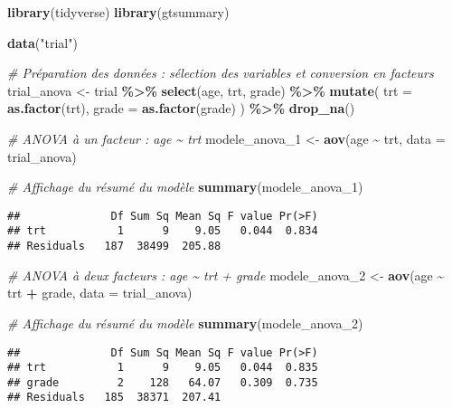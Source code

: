 \documentclass[
]{article}
\newenvironment{Shaded}{\begin{snugshade}}{\end{snugshade}}
\newcommand{\AttributeTok}[1]{\textcolor[rgb]{0.13,0.29,0.53}{#1}}
\newcommand{\CommentTok}[1]{\textcolor[rgb]{0.56,0.35,0.01}{\textit{#1}}}
\newcommand{\FunctionTok}[1]{\textcolor[rgb]{0.13,0.29,0.53}{\textbf{#1}}}
\newcommand{\NormalTok}[1]{#1}
\newcommand{\OtherTok}[1]{\textcolor[rgb]{0.56,0.35,0.01}{#1}}
\newcommand{\SpecialCharTok}[1]{\textcolor[rgb]{0.81,0.36,0.00}{\textbf{#1}}}
\newcommand{\StringTok}[1]{\textcolor[rgb]{0.31,0.60,0.02}{#1}}
\begin{document}
\begin{Shaded}
\begin{Highlighting}[]
\FunctionTok{library}\NormalTok{(tidyverse)}
\FunctionTok{library}\NormalTok{(gtsummary)}

\FunctionTok{data}\NormalTok{(}\StringTok{"trial"}\NormalTok{)}

\CommentTok{\# Préparation des données : sélection des variables et conversion en facteurs}
\NormalTok{trial\_anova }\OtherTok{\textless{}{-}}\NormalTok{ trial }\SpecialCharTok{\%\textgreater{}\%}
  \FunctionTok{select}\NormalTok{(age, trt, grade) }\SpecialCharTok{\%\textgreater{}\%}
  \FunctionTok{mutate}\NormalTok{(}
    \AttributeTok{trt =} \FunctionTok{as.factor}\NormalTok{(trt),}
    \AttributeTok{grade =} \FunctionTok{as.factor}\NormalTok{(grade)}
\NormalTok{  ) }\SpecialCharTok{\%\textgreater{}\%}
  \FunctionTok{drop\_na}\NormalTok{()}


\CommentTok{\# ANOVA à un facteur : age \textasciitilde{} trt}
\NormalTok{modele\_anova\_1 }\OtherTok{\textless{}{-}} \FunctionTok{aov}\NormalTok{(age }\SpecialCharTok{\textasciitilde{}}\NormalTok{ trt, }\AttributeTok{data =}\NormalTok{ trial\_anova)}

\CommentTok{\# Affichage du résumé du modèle}
\FunctionTok{summary}\NormalTok{(modele\_anova\_1)}
\end{Highlighting}
\end{Shaded}

\begin{verbatim}
##              Df Sum Sq Mean Sq F value Pr(>F)
## trt           1      9    9.05   0.044  0.834
## Residuals   187  38499  205.88
\end{verbatim}

\begin{Shaded}
\begin{Highlighting}[]
\CommentTok{\# ANOVA à deux facteurs : age \textasciitilde{} trt + grade}
\NormalTok{modele\_anova\_2 }\OtherTok{\textless{}{-}} \FunctionTok{aov}\NormalTok{(age }\SpecialCharTok{\textasciitilde{}}\NormalTok{ trt }\SpecialCharTok{+}\NormalTok{ grade, }\AttributeTok{data =}\NormalTok{ trial\_anova)}

\CommentTok{\# Affichage du résumé du modèle}
\FunctionTok{summary}\NormalTok{(modele\_anova\_2)}
\end{Highlighting}
\end{Shaded}

\begin{verbatim}
##              Df Sum Sq Mean Sq F value Pr(>F)
## trt           1      9    9.05   0.044  0.835
## grade         2    128   64.07   0.309  0.735
## Residuals   185  38371  207.41
\end{verbatim}
\end{document}
